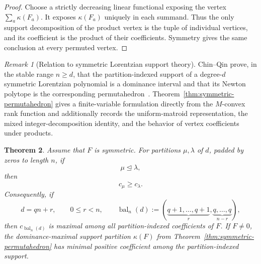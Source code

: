 \documentclass[11pt,a4paper,oneside]{amsart}
\numberwithin{equation}{section}
\newtheorem{theorem}{Theorem}[section]
\theoremstyle{definition}
\theoremstyle{remark}
\newtheorem{remark}[theorem]{Remark}
\begin{document}
\begin{proof}
Choose a strictly decreasing linear functional exposing the vertex $\sum_a\kappa(F_a)$.  It exposes $\kappa(F_a)$ uniquely in each summand.  Thus the only support decomposition of the product vertex is the tuple of individual vertices, and its coefficient is the product of their coefficients.  Symmetry gives the same conclusion at every permuted vertex.
\end{proof}

\begin{remark}[Relation to symmetric Lorentzian support theory]\label{rem:chin-qin-support}
Chin--Qin prove, in the stable range $n\geq d$, that the partition-indexed support of a degree-$d$ symmetric Lorentzian polynomial is a dominance interval and that its Newton polytope is the corresponding permutahedron~\cite[Theorems~3.7 and~3.9]{ChinQin25}.  Theorem~\ref{thm:symmetric-permutahedron} gives a finite-variable formulation directly from the $M$-convex rank function and additionally records the uniform-matroid representation, the mixed integer-decomposition identity, and the behavior of vertex coefficients under products.
\end{remark}

\begin{theorem}\label{thm:dominance-monotonicity}
Assume that $F$ is symmetric.  For partitions $\mu,\lambda$ of $d$, padded by zeros to length $n$, if
\[
 \mu\unlhd\lambda,
\]
then
\begin{equation}\label{eq:dominance-monotonicity}
 c_\mu\geq c_\lambda.
\end{equation}
Consequently, if
\[
 d=qn+r,
 \qquad 0\leq r<n,
 \qquad
 \operatorname{bal}_n(d):=(\underbrace{q+1,\ldots,q+1}_{r},
 \underbrace{q,\ldots,q}_{n-r}),
\]
then $c_{\operatorname{bal}_n(d)}$ is maximal among all partition-indexed coefficients of $F$.  If $F\neq0$, the dominance-maximal support partition $\kappa(F)$ from Theorem~\ref{thm:symmetric-permutahedron} has minimal positive coefficient among the partition-indexed support.
\end{theorem}
\end{document}
